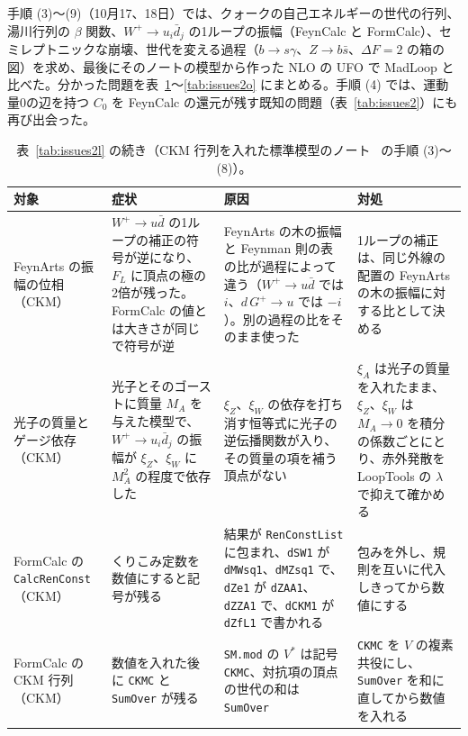 \documentclass[a4paper,10pt]{ltjsarticle}
\begin{document}
手順 (3)〜(9)（10月17、18日）では、クォークの自己エネルギーの世代の行列、湯川行列の $\beta$ 関数、$W^+\to u_i\bar d_j$ の1ループの振幅（FeynCalc と FormCalc）、セミレプトニックな崩壊、世代を変える過程（$b\to s\gamma$、$Z\to b\bar s$、$\Delta F=2$ の箱の図）を求め、最後にそのノートの模型から作った NLO の UFO で MadLoop と比べた。分かった問題を表~\ref{tab:issues2m}〜\ref{tab:issues2o} にまとめる。手順 (4) では、運動量0の辺を持つ $C_0$ を FeynCalc の還元が残す既知の問題（表~\ref{tab:issues2}）にも再び出会った。

\begin{table}[tbp]
\centering\footnotesize
\caption{表~\ref{tab:issues2l} の続き（CKM 行列を入れた標準模型のノート~\cite{smckmnote} の手順 (3)〜(8)）。}
\label{tab:issues2m}
\begin{tabularx}{\linewidth}{>{\raggedright\arraybackslash}p{2.4cm}>{\raggedright\arraybackslash}X>{\raggedright\arraybackslash}X>{\raggedright\arraybackslash}X}
\toprule
\textbf{対象} & \textbf{症状} & \textbf{原因} & \textbf{対処} \\
\midrule
FeynArts の振幅の位相（CKM） & $W^+\to u\bar d$ の1ループの補正の符号が逆になり、$F_L$ に頂点の極の2倍が残った。FormCalc の値とは大きさが同じで符号が逆 & FeynArts の木の振幅と Feynman 則の表の比が過程によって違う（$W^+\to u\bar d$ では $i$、$d\,G^+\to u$ では $-i$）。別の過程の比をそのまま使った & 1ループの補正は、同じ外線の配置の FeynArts の木の振幅に対する比として決める \\
光子の質量とゲージ依存（CKM） & 光子とそのゴーストに質量 $M_A$ を与えた模型で、$W^+\to u_i\bar d_j$ の振幅が $\xi_Z$、$\xi_W$ に $M_A^2$ の程度で依存した & $\xi_Z$、$\xi_W$ の依存を打ち消す恒等式に光子の逆伝播関数が入り、その質量の項を補う頂点がない & $\xi_A$ は光子の質量を入れたまま、$\xi_Z$、$\xi_W$ は $M_A\to0$ を積分の係数ごとにとり、赤外発散を LoopTools の $\lambda$ で抑えて確かめる \\
FormCalc の \texttt{CalcRenConst}（CKM） & くりこみ定数を数値にすると記号が残る & 結果が \texttt{RenConstList} に包まれ、\texttt{dSW1} が \texttt{dMWsq1}、\texttt{dMZsq1} で、\texttt{dZe1} が \texttt{dZAA1}、\texttt{dZZA1} で、\texttt{dCKM1} が \texttt{dZfL1} で書かれる & 包みを外し、規則を互いに代入しきってから数値にする \\
FormCalc の CKM 行列（CKM） & 数値を入れた後に \texttt{CKMC} と \texttt{SumOver} が残る & \texttt{SM.mod} の $V^*$ は記号 \texttt{CKMC}、対抗項の頂点の世代の和は \texttt{SumOver} & \texttt{CKMC} を $V$ の複素共役にし、\texttt{SumOver} を和に直してから数値を入れる \\

\end{tabularx}
\end{table}
\end{document}
